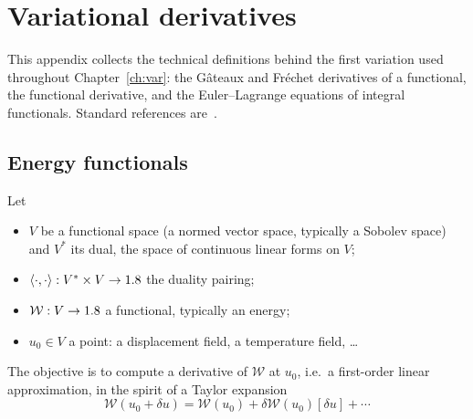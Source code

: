 \chapter{Variational derivatives}\label{app:derivatives}

This appendix collects the technical definitions behind the first variation
used throughout Chapter~\ref{ch:var}: the G\^ateaux and Fr\'echet derivatives
of a functional, the functional derivative, and the Euler--Lagrange equations
of integral functionals. Standard references are~\cite{GelfandFomin,DacorognaIntro}.

\section{Energy functionals}
Let
\begin{itemize}
  \item $V$ be a functional space (a normed vector space, typically a Sobolev
  space) and $V^\ast$ its dual, the space of continuous linear forms on $V$;
  \item $\langle \cdot,\cdot\rangle:V^\ast\times V\to1.8$ the duality pairing;
  \item $\mathcal W:V\to1.8$ a functional, typically an energy;
  \item $u_0\in V$ a point: a displacement field, a temperature field, \dots
\end{itemize}
The objective is to compute a derivative of $\mathcal W$ at $u_0$, i.e.\ a
first-order linear approximation, in the spirit of a Taylor expansion
\[
  \mathcal W(u_0+\delta u)=\mathcal W(u_0)+\delta\mathcal W(u_0)[\delta u]+\cdots
\]


